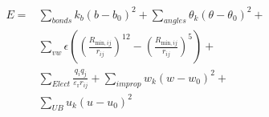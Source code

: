 \documentclass[paper=a5,fontsize=16pt]{scrbook}
\begin{document}
            \begin{preview}

            
            \begin{align*}
            E = &\sum_{bonds} k_b (b - b_0)^2 + \sum_{angles} \theta_k (\theta - \theta_0)^2 + \\
            & \sum_{vw} \epsilon(  (\frac{R_{\text{min},ij}}{r_{ij}})^{12} - (\frac{R_{\text{min},ij}}{r_{ij}})^5) + \\
            & \sum_{Elect} \frac{q_i q_j}{\varepsilon_{\text{r}} r_{ij}} + \sum_{improp} w_k (w - w_0)^2 + \\
            & \sum_{UB} u_k (u - u_0)^2
            \end{align*}
            


            \end{preview}
            
\end{document}
